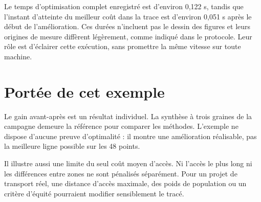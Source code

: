 Le temps d'optimisation complet enregistré est d'environ 0,122 s, tandis que
l'instant d'atteinte du meilleur coût dans la trace est d'environ 0,051 s
après le début de l'amélioration. Ces durées n'incluent pas le dessin des
figures et leurs origines de mesure diffèrent légèrement, comme indiqué
dans le protocole. Leur rôle est d'éclairer cette exécution, sans promettre
la même vitesse sur toute machine.

\section{Portée de cet exemple}
Le gain avant-après est un résultat individuel. La synthèse à trois graines
de la campagne demeure la référence pour comparer les méthodes. L'exemple
ne dispose d'aucune preuve d'optimalité : il montre une amélioration
réalisable, pas la meilleure ligne possible sur les 48 points.

Il illustre aussi une limite du seul coût moyen d'accès. Ni l'accès le plus
long ni les différences entre zones ne sont pénalisés séparément. Pour un
projet de transport réel, une distance d'accès maximale, des poids de
population ou un critère d'équité pourraient modifier sensiblement le tracé.
